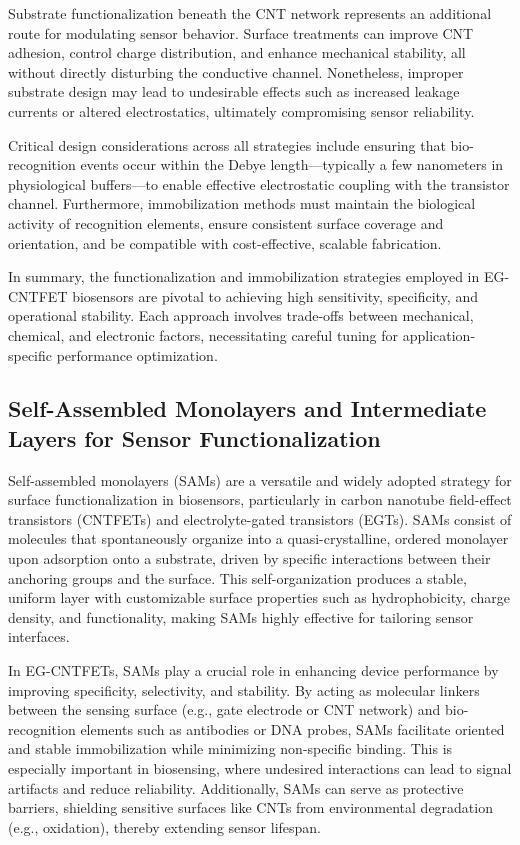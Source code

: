 Substrate functionalization beneath the CNT network represents an additional route for modulating sensor behavior. Surface treatments can improve CNT adhesion, control charge distribution, and enhance mechanical stability, all without directly disturbing the conductive channel. Nonetheless, improper substrate design may lead to undesirable effects such as increased leakage currents or altered electrostatics, ultimately compromising sensor reliability.

Critical design considerations across all strategies include ensuring that bio-recognition events occur within the Debye length—typically a few nanometers in physiological buffers—to enable effective electrostatic coupling with the transistor channel. Furthermore, immobilization methods must maintain the biological activity of recognition elements, ensure consistent surface coverage and orientation, and be compatible with cost-effective, scalable fabrication.

In summary, the functionalization and immobilization strategies employed in EG-CNTFET biosensors are pivotal to achieving high sensitivity, specificity, and operational stability. Each approach involves trade-offs between mechanical, chemical, and electronic factors, necessitating careful tuning for application-specific performance optimization.

\subsection{Self-Assembled Monolayers and Intermediate Layers for Sensor Functionalization}

Self-assembled monolayers (SAMs) are a versatile and widely adopted strategy for surface functionalization in biosensors, particularly in carbon nanotube field-effect transistors (CNTFETs) and electrolyte-gated transistors (EGTs). SAMs consist of molecules that spontaneously organize into a quasi-crystalline, ordered monolayer upon adsorption onto a substrate, driven by specific interactions between their anchoring groups and the surface. This self-organization produces a stable, uniform layer with customizable surface properties such as hydrophobicity, charge density, and functionality, making SAMs highly effective for tailoring sensor interfaces.

In EG-CNTFETs, SAMs play a crucial role in enhancing device performance by improving specificity, selectivity, and stability. By acting as molecular linkers between the sensing surface (e.g., gate electrode or CNT network) and bio-recognition elements such as antibodies or DNA probes, SAMs facilitate oriented and stable immobilization while minimizing non-specific binding. This is especially important in biosensing, where undesired interactions can lead to signal artifacts and reduce reliability. Additionally, SAMs can serve as protective barriers, shielding sensitive surfaces like CNTs from environmental degradation (e.g., oxidation), thereby extending sensor lifespan.

